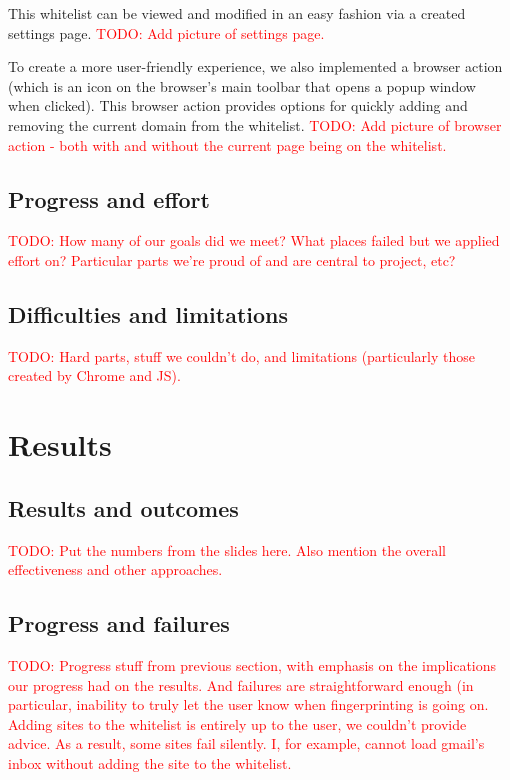 \documentclass[12pt,a4paper]{article}
\begin{document}
This whitelist can be viewed and modified in an easy fashion via a created settings page. \textcolor{red}{TODO: Add picture of settings page.}

To create a more user-friendly experience, we also implemented a browser action (which is an icon on the browser's main toolbar that opens a popup window when clicked). This browser action provides options for quickly adding and removing the current domain from the whitelist. \textcolor{red}{TODO: Add picture of browser action - both with and without the current page being on the whitelist.}

\subsection{Progress and effort}
\textcolor{red}{TODO: How many of our goals did we meet? What places failed but we applied effort on? Particular parts we're proud of and are central to project, etc?}

\subsection{Difficulties and limitations}
\textcolor{red}{TODO: Hard parts, stuff we couldn't do, and limitations (particularly those created by Chrome and JS).}

\section{Results}
\subsection{Results and outcomes}
\label{subsec:results}
\textcolor{red}{TODO: Put the numbers from the slides here. Also mention the overall effectiveness and other approaches.}

\subsection{Progress and failures}
\textcolor{red}{TODO: Progress stuff from previous section, with emphasis on the implications our progress had on the results. And failures are straightforward enough (in particular, inability to truly let the user know when fingerprinting is going on. Adding sites to the whitelist is entirely up to the user, we couldn't provide advice. As a result, some sites fail silently. I, for example, cannot load gmail's inbox without adding the site to the whitelist.}
\end{document}
